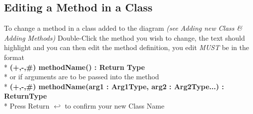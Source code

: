 \documentclass[a4paper]{article}
\newcommand{\tab}{\hspace*{2em}}
\begin{document}
\newpage

\subsection{Editing a Method in a Class}
To change a method in a class added to the diagram \emph{(see Adding new Class \& Adding Methods)} Double-Click the method you wish to change, the text should highlight and you can then edit the method definition, you edit \emph{MUST} be in the format \\*
\tab \tab \textbf{(+,-,\#) methodName() : Return Type}\\* 
or if arguments are to be passed into the method\\* 
\tab \tab \textbf{(+,-,\#) methodName(arg1 : Arg1Type, arg2 : Arg2Type...) : ReturnType}\\*
Press Return $\hookleftarrow$ to confirm your new Class Name
\end{document}
